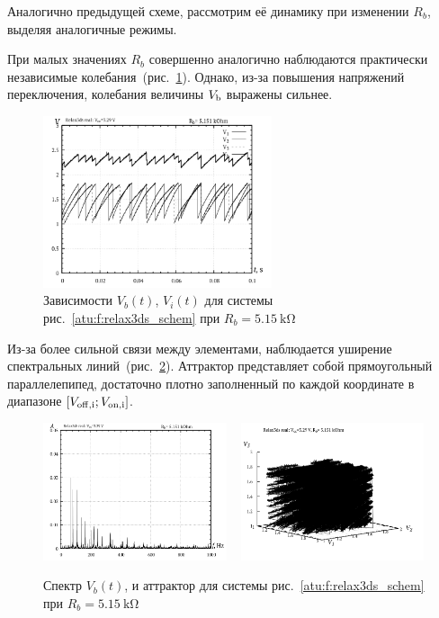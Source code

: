 Аналогично предыдущей схеме, рассмотрим её динамику при
изменении $R_b$, выделяя аналогичные режимы.


При малых
значениях $R_b$
совершенно аналогично наблюдаются практически независимые
колебания~(рис.~\ref{atu:f:relax3ds_t_05151}).
Однако, из-за повышения напряжений переключения,
колебания величины $V_\mathrm{b}$
выражены сильнее.

\begin{figure}[htb!]
  \centerline{\includegraphics[width=0.6\textwidth]{p/relax3ds_t_005151.png} }
  \caption{Зависимости $V_b(t)$, $V_i(t)$ для системы рис.~\ref{atu:f:relax3ds_schem} при $R_b=\SI{5.15}{\kilo\ohm}$ }
  \label{atu:f:relax3ds_t_05151}
\end{figure}


Из-за более сильной связи между элементами,
наблюдается уширение спектральных линий~(рис.~\ref{atu:f:relax3ds_f_05151}).
Аттрактор представляет собой прямоугольный параллелепипед, достаточно плотно заполненный по каждой координате в
диапазоне $[ V_\mathrm{off,i} ; V_\mathrm{on,i} ] $.


\begin{figure}[htb!]
  \centerline{
    \includegraphics[width=0.48\textwidth]{p/relax3ds_f_005151.png}
    ~
    \includegraphics[width=0.48\textwidth]{p/relax3ds_v1v2v3_005151.png}
  }
  \caption{Спектр $V_b(t)$, и аттрактор для системы рис.~\ref{atu:f:relax3ds_schem} при $R_b=\SI{5.15}{\kilo\ohm}$ }
  \label{atu:f:relax3ds_f_05151}
\end{figure}


